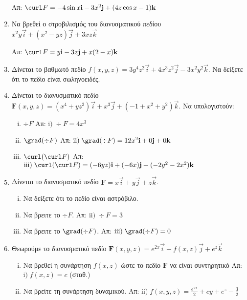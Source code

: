 \begin{enumerate}
    \hfill Απ: $\curl F=-4\sin x\vec{i}-3x^2\vec{j}+(4z\cos x-1)\vec{k}$

  \item Να βρεθεί ο στροβιλισμός του διανυσματικού πεδίου 
    $ x^2y\vec{i}+(x^2-yz)\vec{j}+3xz\vec{k} $

    \hfill Απ: $\curl F=y\vec{i}-3z\vec{j}+x(2-x)\vec{k}$

  \item Δίνεται το βαθμωτό πεδίο 
    $f(x,y,z)=3y^4z^2\vec{i}+4x^3z^2\vec{j}-3x^2y^2\vec{k}$. Να δείξετε ότι το 
    πεδίο είναι σωληνοειδές.

  \item Δίνεται το διανυσματικό πεδίο 
    $\boldsymbol{F}(x,y,z)=(x^4+yz^3)\vec{i}+x^3\vec{j}+(-1+x^2+y^2)\vec{k}$. 
    Να υπολογιστούν:
    \begin{enumerate}[i)]
      \item $\div F$ \hfill Απ: $\mathrm{i)}\; \div F=4x^3$ 
      \item $\grad(\div F)$ \hfill Απ:  
        $\mathrm{ii)}\; \grad(\div F)=12x^2\vec{i}+0\vec{j}+0\vec{k}$ 
      \item $\curl(\curl F)$
        \hfill Απ: 
        $\mathrm{iii)}\; \curl(\curl F)=(-6yz)\vec{i}+(-6x)\vec{j}+(-2y^2-2x^2)\vec{k}$

    \end{enumerate}

  \item Δίνεται το διανυσματικό πεδίο $\boldsymbol{F}=x\vec{i}+y\vec{j}+z\vec{k}$. 
    \begin{enumerate}[i)]
      \item Να δείξετε ότι το πεδίο είναι αστρόβιλο.
      \item Να βρειτε το $\div F$. \hfill Απ: $\mathrm{ii)}\; \div F=3$ 
      \item Να βρειτε το $\grad(\div F)$.
        \hfill Απ: $\mathrm{iii)}\; \grad(\div F)=0$
    \end{enumerate}



  \item Θεωρούμε το διανυσματικό πεδίο 
    $\boldsymbol{F}(x,y,z)=e^{2x}\vec{i}+f(x,z)\vec{j}+e^z\vec{k}$ 
    \begin{enumerate}[i)]
      \item Να βρεθεί η συνάρτηση $f(x,z)$ ώστε το πεδίο $ \bm{F} $ 
        να είναι συντηρητικό \hfill Απ:  $\mathrm{i)}\; f(x,z)=c$ (σταθ.)
      \item Να βρείτε τη συνάρτηση δυναμικού.
        \hfill Απ:  $\mathrm{ii)}\;f(x,y,z)=\frac{e^{2x}}{2}+cy+e^z-\frac{3}{2}$
    \end{enumerate}
\end{enumerate}



